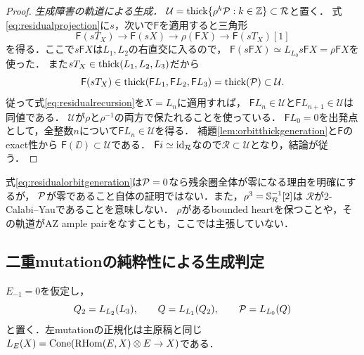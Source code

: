\documentclass[11pt,a4paper]{ltjsarticle}
\begin{document}
\begin{proof}
\emph{生成障害の軌道による生成．}
$\mathcal U=\operatorname{thick}\{\rho^k\mathcal P:k\in\mathbb Z\}\subset\mathcal R$と置く．
式\eqref{eq:residualprojection}に$s$，次いで$\mathsf F$を適用すると三角形
\begin{equation}\label{eq:residualrecursion}
 \mathsf F(sT_X)\longrightarrow\mathsf F(sX)
 \longrightarrow\rho(\mathsf F X)\longrightarrow\mathsf F(sT_X)[1]
\end{equation}
を得る．ここで$s\mathsf F X$は$L_1,L_2$の右直交に入るので，
$\mathsf F(s\mathsf F X)\simeq L_{L_0}s\mathsf F X=\rho\mathsf F X$を使った．
また$sT_X\in\operatorname{thick}(L_1,L_2,L_3)$だから
\[
 \mathsf F(sT_X)\in\operatorname{thick}(\mathsf FL_1,\mathsf FL_2,\mathsf FL_3)
 =\operatorname{thick}(\mathcal P)\subset\mathcal U.
\]
従って式\eqref{eq:residualrecursion}を$X=L_n$に適用すれば，
$\mathsf F L_n\in\mathcal U$と$\mathsf F L_{n+1}\in\mathcal U$は同値である．
$\mathcal U$が$\rho$と$\rho^{-1}$の両方で保たれることを使っている．
$\mathsf F L_0=0$を出発点として，全整数$n$について$\mathsf F L_n\in\mathcal U$を得る．
補題\ref{lem:orbitthickgeneration}と$\mathsf F$のexact性から
$\mathsf F(\DD)\subset\mathcal U$である．
$\mathsf F i\simeq\operatorname{id}_{\mathcal R}$なので$\mathcal R\subset\mathcal U$となり，結論が従う．
\end{proof}

\begin{remark}\label{rem:residualstatus}
式\eqref{eq:residualorbitgeneration}は$\mathcal P=0$なら残余圏全体が零になる理由を明確にするが，
$\mathcal P$が零であること自体の証明ではない．また，$\rho^3=\mathbb S_{\mathcal R}^{-1}[2]$は
$\mathcal R$が2-Calabi--Yauであることを意味しない．
$\rho$があるbounded heartを保つことや，その軌道がAZ ample pairをなすことも，ここでは主張していない．
\end{remark}

\subsection{二重mutationの純粋性による生成判定}\label{sec:mutationpurity}
$E_{-1}=0$を仮定し，
\[
 Q_2=L_{L_2}(L_3),\qquad Q=L_{L_1}(Q_2),\qquad
 \mathcal P=L_{L_0}(Q)
\]
と置く．左mutationの正規化は主原稿と同じ
$L_E(X)=\operatorname{Cone}(\operatorname{RHom}(E,X)\otimes E\to X)$である．
\end{document}
